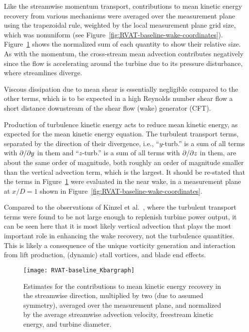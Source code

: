 Like the streamwise momentum transport, contributions to mean kinetic energy
recovery from various mechanisms were averaged over the  measurement plane using
the trapezoidal rule, weighted by the local measurement plane grid size, which
was nonuniform (see Figure~\ref{fig:RVAT-baseline-wake-coordinates}).
Figure~\ref{fig:RVAT-baseline-Kbargraph} shows the normalized sum of each
quantity to show their relative size. As with the momentum, the cross-stream
mean advection contributes negatively since the flow is accelerating around the
turbine due to its pressure disturbance, where streamlines diverge.

Viscous dissipation due to mean shear is essentially negligible compared to
the other terms, which is to be expected in a high Reynolds number shear flow a
short distance downstream of the shear flow (wake) generator (CFT).

Production of turbulence kinetic energy acts to reduce mean kinetic energy, as
expected for the mean kinetic energy equation. The turbulent transport terms,
separated by the direction of their divergence, i.e., ``$y$-turb.'' is a sum of
all terms with $\partial / \partial y$ in them and ``$z$-turb.'' is a sum of all terms with
$\partial / \partial z$ in them, are about the same order of magnitude, both roughly an
order of magnitude smaller than the vertical advection term, which is the
largest. It should be re-stated that the terms in
Figure~\ref{fig:RVAT-baseline-Kbargraph} were evaluated in the near wake, in a
measurement plane at $x/D=1$ shown in
Figure~\ref{fig:RVAT-baseline-wake-coordinates}.

Compared to the observations of Kinzel et al.~\cite{Kinzel2012}, where the
turbulent transport terms were found to be not large enough to replenish turbine
power output, it can be seen here that it is most likely vertical advection that
plays the most important role in enhancing the wake recovery, not the turbulence
quantities. This is likely a consequence of the unique vorticity generation and
interaction from lift production, (dynamic) stall vortices, and blade end
effects.

\begin{figure}
    \centering

    \texttt{[image: RVAT-baseline\_Kbargraph]}

    \caption{Estimates for the contributions to mean kinetic energy recovery in
        the streamwise direction, multiplied by two (due to assumed symmetry),
        averaged over the measurement plane, and normalized by the average
        streamwise advection velocity, freestream kinetic energy, and turbine
        diameter.}

    \label{fig:RVAT-baseline-Kbargraph}
\end{figure}


